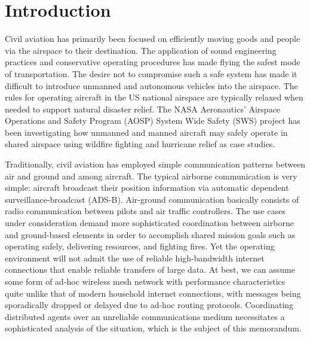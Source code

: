 \section{Introduction}

Civil aviation has primarily been focused on efficiently moving goods
and people via the airspace to their destination. The application of
sound engineering practices and conservative operating procedures has
made flying the safest mode of transportation. The desire not to
compromise such a safe system has made it difficult to introduce
unmanned and autonomous vehicles into the airspace. The rules for
operating aircraft in the US national airspace are typically relaxed
when needed to support natural disaster relief. The NASA Aeronautics'
Airspace Operations and Safety Program (AOSP) System Wide Safety (SWS)
project has been investigating how unmanned and manned aircraft may
safely operate in shared airspace using wildfire fighting and
hurricane relief as case studies.

Traditionally, civil aviation has employed simple communication
patterns between air and ground and among aircraft. The typical
airborne communication is very simple: aircraft broadcast their
position information via automatic dependent surveillance-broadcast
(ADS-B). Air-ground communication basically consists of radio
communication between pilots and air traffic controllers. The use
cases under consideration demand more sophisticated coordination
between airborne and ground-based elements in order to accomplish
shared mission goals such as operating safely, delivering resources,
and fighting fires. Yet the operating environment will not admit the
use of reliable high-bandwidth internet connections that enable
reliable transfers of large data. At best, we can assume some form of
ad-hoc wireless mesh network with performance characteristics quite
unlike that of modern household internet connections, with messages
being sporadically dropped or delayed due to ad-hoc routing
protocols. Coordinating distributed agents over an unreliable
communications medium necessitates a sophisticated analysis of the
situation, which is the subject of this memorandum.


